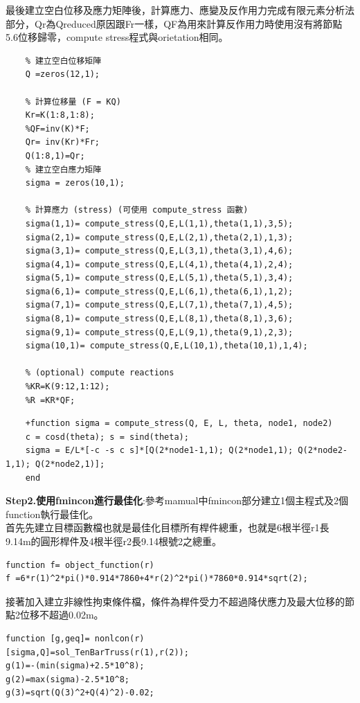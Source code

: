 \documentclass[12pt]{article}
\begin{document}
\begin{CJK}{UTF8}{bkai}
最後建立空白位移及應力矩陣後，計算應力、應變及反作用力完成有限元素分析法部分，Qr為Qreduced原因跟Fr一樣，QF為用來計算反作用力時使用沒有將節點5.6位移歸零，compute stress程式與orietation相同。

\begin{lstlisting}
	% 建立空白位移矩陣
    Q =zeros(12,1);
  
    % 計算位移量 (F = KQ)
    Kr=K(1:8,1:8);
    %QF=inv(K)*F;
    Qr= inv(Kr)*Fr;
    Q(1:8,1)=Qr;
    % 建立空白應力矩陣
    sigma = zeros(10,1);
  
    % 計算應力 (stress) (可使用 compute_stress 函數)
    sigma(1,1)= compute_stress(Q,E,L(1,1),theta(1,1),3,5);
    sigma(2,1)= compute_stress(Q,E,L(2,1),theta(2,1),1,3);
    sigma(3,1)= compute_stress(Q,E,L(3,1),theta(3,1),4,6);
    sigma(4,1)= compute_stress(Q,E,L(4,1),theta(4,1),2,4);
    sigma(5,1)= compute_stress(Q,E,L(5,1),theta(5,1),3,4);
    sigma(6,1)= compute_stress(Q,E,L(6,1),theta(6,1),1,2);
    sigma(7,1)= compute_stress(Q,E,L(7,1),theta(7,1),4,5);
    sigma(8,1)= compute_stress(Q,E,L(8,1),theta(8,1),3,6);
    sigma(9,1)= compute_stress(Q,E,L(9,1),theta(9,1),2,3);
    sigma(10,1)= compute_stress(Q,E,L(10,1),theta(10,1),1,4);

    % (optional) compute reactions
    %KR=K(9:12,1:12);
    %R =KR*QF;
\end{lstlisting}

\begin{lstlisting}
	+function sigma = compute_stress(Q, E, L, theta, node1, node2)
    c = cosd(theta); s = sind(theta);
    sigma = E/L*[-c -s c s]*[Q(2*node1-1,1); Q(2*node1,1); Q(2*node2-1,1); Q(2*node2,1)];
	end
\end{lstlisting}

\textbf{Step2.使用fmincon進行最佳化}:參考mamual中fmincon部分建立1個主程式及2個function執行最佳化。\\

首先先建立目標函數檔也就是最佳化目標所有桿件總重，也就是6根半徑r1長9.14m的圓形桿件及4根半徑r2長9.14根號2之總重。

\begin{lstlisting}
function f= object_function(r)
f =6*r(1)^2*pi()*0.914*7860+4*r(2)^2*pi()*7860*0.914*sqrt(2);
\end{lstlisting}

接著加入建立非線性拘束條件檔，條件為桿件受力不超過降伏應力及最大位移的節點2位移不超過0.02m。
\begin{lstlisting}
function [g,geq]= nonlcon(r)
[sigma,Q]=sol_TenBarTruss(r(1),r(2));
g(1)=-(min(sigma)+2.5*10^8);
g(2)=max(sigma)-2.5*10^8;
g(3)=sqrt(Q(3)^2+Q(4)^2)-0.02;


\end{lstlisting}
\end{CJK}
\end{document}
